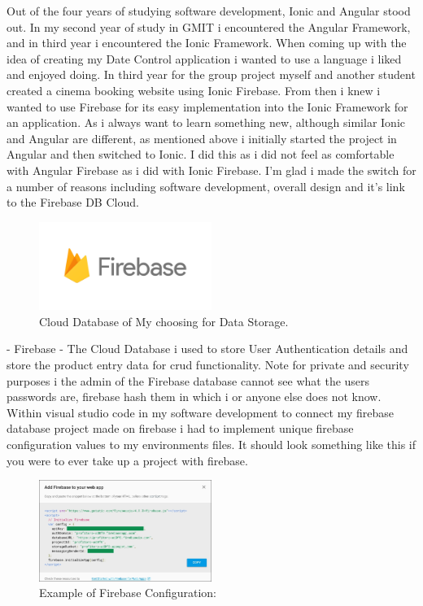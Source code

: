 Out of the four years of studying software development, Ionic and Angular stood out. In my second year of study in GMIT i encountered the Angular Framework, and in third year i encountered the Ionic Framework. When coming up with the idea of creating my Date Control application i wanted to use a language i liked and enjoyed doing. In third year for the group project myself and another student created a cinema booking website using Ionic Firebase. From then i knew i wanted to use Firebase for its easy implementation into the Ionic Framework for an application. As i always want to learn something new, although similar Ionic and Angular are different, as mentioned above i initially started the project in Angular and then switched to Ionic. I did this as i did not feel as comfortable with Angular Firebase as i did with Ionic Firebase. I'm glad i made the switch for a number of reasons including software development, overall design and it's link to the Firebase DB Cloud.
\newline

\begin{figure}[h!]
	\caption{Cloud Database of My choosing for Data Storage.}
	\label{image:fire-base}
	\centering
	\includegraphics[width=0.5\textwidth]{images/fire-base.png}
\end{figure}

- Firebase - The Cloud Database i used to store User Authentication details and store the product entry data for crud functionality. Note for private and security purposes i the admin of the Firebase database cannot see what the users passwords are, firebase hash them in which i or anyone else does not know. Within visual studio code in my software development to connect my firebase database project made on firebase i had to implement unique firebase configuration values to my environments files. It should look something like this if you were to ever take up a project with firebase.   
\newline

\begin{figure}[h!]
	\caption{Example of Firebase Configuration:}
	\label{image:firebaseConfig}
	\centering
	\includegraphics[width=0.5\textwidth]{images/firebaseConfig.jpg}
\end{figure}


